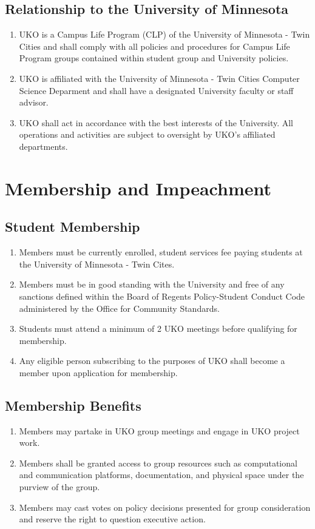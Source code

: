 \documentclass[12pt,executivepaper]{article}
\begin{document}
\subsection{Relationship to the University of Minnesota}
\begin{enumerate}
    \item UKO is a Campus Life Program (CLP) of the University of Minnesota -
          Twin Cities and shall comply with all policies and procedures for
          Campus Life Program groups contained within student group and
          University policies.
    \item UKO is affiliated with the University of Minnesota - Twin Cities
          Computer Science Deparment and shall have a designated University
          faculty or staff advisor.
    \item UKO shall act in accordance with the best interests of the
          University. All operations and activities are subject to oversight
          by UKO's affiliated departments.
\end{enumerate}

\section{Membership and Impeachment}

\subsection{Student Membership}
\begin{enumerate}
    \item Members must be currently enrolled, student services fee paying students at the
          University of Minnesota - Twin Cites.
    \item Members must be in good standing with the University and free of any sanctions defined
          within the Board of Regents Policy-Student Conduct Code administered by the Office
          for Community Standards.
    \item Students must attend a minimum of 2 UKO meetings before qualifying for
          membership.
    \item Any eligible person subscribing to the purposes of UKO shall become a
          member upon application for membership.
\end{enumerate}

\subsection{Membership Benefits}
\begin{enumerate}
    \item Members may partake in UKO group meetings and engage in UKO project work.
    \item Members shall be granted access to group resources such as computational
          and communication platforms, documentation, and physical space under the
          purview of the group.
    \item Members may cast votes on policy decisions presented for group consideration
          and reserve the right to question executive action.
\end{enumerate}
\end{document}

